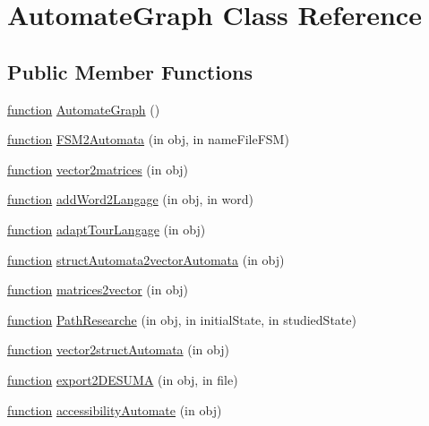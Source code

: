 \hypertarget{class_automate_graph}{}\section{Automate\+Graph Class Reference}
\label{class_automate_graph}
\subsection*{Public Member Functions}
\begin{DoxyCompactItemize}
\item 
\hyperlink{_plan__desuma_functions_8m_ac2ffb26d6f42d3bbcd7847b0873403f4}{function} \hyperlink{class_automate_graph_aff151c681b4561197919d5820d1e1053}{Automate\+Graph} ()
\item 
\hyperlink{_plan__desuma_functions_8m_ac2ffb26d6f42d3bbcd7847b0873403f4}{function} \hyperlink{class_automate_graph_a9d58f1207ae9aba73d03bef475d47576}{F\+S\+M2\+Automata} (in obj, in name\+File\+F\+SM)
\item 
\hyperlink{_plan__desuma_functions_8m_ac2ffb26d6f42d3bbcd7847b0873403f4}{function} \hyperlink{class_automate_graph_a7fd73b5515afca80d5e86bbcac75b4c2}{vector2matrices} (in obj)
\item 
\hyperlink{_plan__desuma_functions_8m_ac2ffb26d6f42d3bbcd7847b0873403f4}{function} \hyperlink{class_automate_graph_ab22c8bf6e3defba441f651eed8cae19e}{add\+Word2\+Langage} (in obj, in word)
\item 
\hyperlink{_plan__desuma_functions_8m_ac2ffb26d6f42d3bbcd7847b0873403f4}{function} \hyperlink{class_automate_graph_a8e02a22fec54ff1401fe9118160274de}{adapt\+Tour\+Langage} (in obj)
\item 
\hyperlink{_plan__desuma_functions_8m_ac2ffb26d6f42d3bbcd7847b0873403f4}{function} \hyperlink{class_automate_graph_a3a9f9ebd72ecfd154977da272eb5a50c}{struct\+Automata2vector\+Automata} (in obj)
\item 
\hyperlink{_plan__desuma_functions_8m_ac2ffb26d6f42d3bbcd7847b0873403f4}{function} \hyperlink{class_automate_graph_a1d3dec7ebe07e4a18446dfafdc04c89d}{matrices2vector} (in obj)
\item 
\hyperlink{_plan__desuma_functions_8m_ac2ffb26d6f42d3bbcd7847b0873403f4}{function} \hyperlink{class_automate_graph_aa213172c8c114955cf1890a86a7cdd48}{Path\+Researche} (in obj, in initial\+State, in studied\+State)
\item 
\hyperlink{_plan__desuma_functions_8m_ac2ffb26d6f42d3bbcd7847b0873403f4}{function} \hyperlink{class_automate_graph_a956c136667dd61b62ed8aca48ba18ce3}{vector2struct\+Automata} (in obj)
\item 
\hyperlink{_plan__desuma_functions_8m_ac2ffb26d6f42d3bbcd7847b0873403f4}{function} \hyperlink{class_automate_graph_ad52b82012bbc9d8d246760f88fc78757}{export2\+D\+E\+S\+U\+MA} (in obj, in file)
\item 
\hyperlink{_plan__desuma_functions_8m_ac2ffb26d6f42d3bbcd7847b0873403f4}{function} \hyperlink{class_automate_graph_af2c974a8c1188f055e5661fd6a849f7a}{accessibility\+Automate} (in obj)
\end{DoxyCompactItemize}
